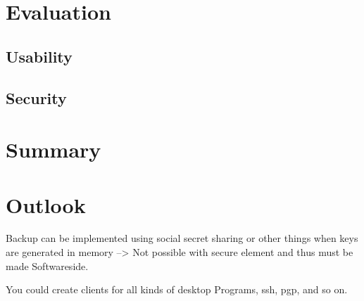 \documentclass[12pt,oneside,a4paper,parskip]{scrbook}
\begin{document}


\chapter{Evaluation}

\section{Usability}

\section{Security}



\chapter{Summary}

\chapter{Outlook}

Backup can be implemented using social secret sharing or other things when keys are generated in memory --> Not possible with secure element and thus must be made Softwareside. 

You could create clients for all kinds of desktop Programs, ssh, pgp, and so on.

\backmatter

\listoffigures
{}



\cleardoublepage
{}
{}
\printbibliography
\end{document}
